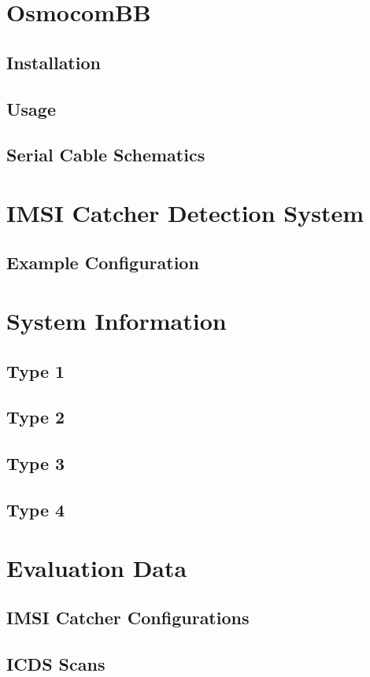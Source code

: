 \chapter{OsmocomBB}
\section{Installation}
\label{sec:osmo_install}
\section{Usage}
\label{sec:osmo_usage}
\section{Serial Cable Schematics}
\label{sec:osmo_serial_schematics}

\chapter{IMSI Catcher Detection System}

\section{Example Configuration}

\chapter{System Information}
\label{sec:system_infos}
\section{Type 1}
\section{Type 2}
\section{Type 3}
\section{Type 4}

\chapter{Evaluation Data}
\section{IMSI Catcher Configurations}
\section{ICDS Scans}